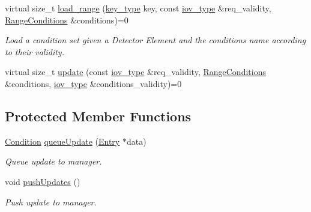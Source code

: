 \begin{DoxyCompactItemize}
virtual size\+\_\+t \hyperlink{class_d_d4hep_1_1_conditions_1_1_conditions_data_loader_a7c62044af7a8672ab9cb2b5bcf1022b3}{load\+\_\+range} (\hyperlink{class_d_d4hep_1_1_conditions_1_1_conditions_data_loader_ac17b71656c9d6b5365c62d1d606ba8cc}{key\+\_\+type} key, const \hyperlink{class_d_d4hep_1_1_conditions_1_1_conditions_data_loader_a510aa9a02f5e798d8d96c9e3cb5a36af}{iov\+\_\+type} \&req\+\_\+validity, \hyperlink{namespace_d_d4hep_1_1_conditions_ae765f0140a33973a430280f02b6062f4}{Range\+Conditions} \&conditions)=0
\begin{DoxyCompactList}\small\item\em Load a condition set given a Detector Element and the conditions name according to their validity. \end{DoxyCompactList}\item 
virtual size\+\_\+t \hyperlink{class_d_d4hep_1_1_conditions_1_1_conditions_data_loader_a927c3e60a4ea2873d97433900783ffc1}{update} (const \hyperlink{class_d_d4hep_1_1_conditions_1_1_conditions_data_loader_a510aa9a02f5e798d8d96c9e3cb5a36af}{iov\+\_\+type} \&req\+\_\+validity, \hyperlink{namespace_d_d4hep_1_1_conditions_ae765f0140a33973a430280f02b6062f4}{Range\+Conditions} \&conditions, \hyperlink{class_d_d4hep_1_1_conditions_1_1_conditions_data_loader_a510aa9a02f5e798d8d96c9e3cb5a36af}{iov\+\_\+type} \&conditions\+\_\+validity)=0
\end{DoxyCompactItemize}
\subsection*{Protected Member Functions}
\begin{DoxyCompactItemize}
\item 
\hyperlink{class_d_d4hep_1_1_conditions_1_1_condition}{Condition} \hyperlink{class_d_d4hep_1_1_conditions_1_1_conditions_data_loader_a1538131327aebb04c554cecf4c512bb7}{queue\+Update} (\hyperlink{class_d_d4hep_1_1_conditions_1_1_entry}{Entry} $\ast$data)
\begin{DoxyCompactList}\small\item\em Queue update to manager. \end{DoxyCompactList}\item 
void \hyperlink{class_d_d4hep_1_1_conditions_1_1_conditions_data_loader_a65ad637b1fa714f1d3b784fdfcdccd37}{push\+Updates} ()
\begin{DoxyCompactList}\small\item\em Push update to manager. \end{DoxyCompactList}\end{DoxyCompactItemize}
